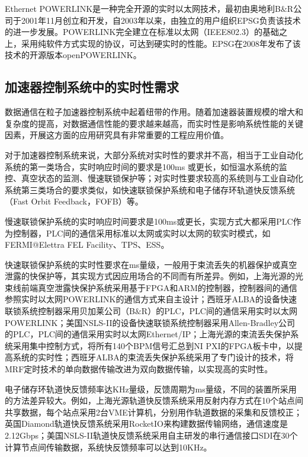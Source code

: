 Ethernet POWERLINK是一种完全开源的实时以太网技术，最初由奥地利B$\&$R公司于2001年11月创立和开发，自2003年以来，由独立的用户组织EPSG负责该技术的进一步发展。POWERLINK完全建立在标准以太网（IEEE802.3）的基础之上，采用纯软件方式实现的协议，可达到硬实时的性能。EPSG在2008年发布了该技术的开源版本openPOWERLINK\cite{powerlink}。

\subsection{加速器控制系统中的实时性需求}
数据通信在粒子加速器控制系统中起着纽带的作用。随着加速器装置规模的增大和复杂度的提高，对数据通信性能的要求越来越高，而实时性是影响系统性能的关键因素，开展这方面的应用研究具有非常重要的工程应用价值。

对于加速器控制系统来说，大部分系统对实时性的要求并不高，相当于工业自动化系统的第一类场合，实时响应时间的要求是100ms 或更长，如恒温水系统的监控、真空状态的监测、慢速联锁保护等；对实时性要求较高的系统则与工业自动化系统第三类场合的要求类似，如快速联锁保护系统和电子储存环轨道快反馈系统（Fast Orbit Feedback，FOFB）等。

慢速联锁保护系统的实时响应时间要求是100ms或更长，实现方式大都采用PLC作为控制器，PLC间的通信采用标准以太网或实时以太网的软实时模式，如FERMI@Elettra FEL Facility、TPS、ESS\cite{FERMI,Liao2014,ESS}。

快速联锁保护系统的实时性要求在ms量级，一般用于束流丢失的机器保护或真空泄露的快保护等，其实现方式因应用场合的不同而有所差异。例如，上海光源的光束线前端真空泄露快保护系统采用基于FPGA和ARM的控制器，控制器间的通信参照实时以太网POWERLINK的通信方式来自主设计；西班牙ALBA的设备快速联锁系统控制器采用贝加莱公司（B$\&$R）的PLC，PLC间的通信采用实时以太网POWERLINK；美国NSLS-II的设备快速联锁系统控制器采用Allen-Bradley公司的PLC，PLC间的通信采用实时以太网Ethernet/IP；上海光源的束流丢失保护系统采用集中控制方式，将所有140个BPM信号汇总到NI PXI的FPGA板卡中，以提高系统的实时性；西班牙ALBA的束流丢失保护系统采用了专门设计的技术，将MRF定时技术的单向数据传输改进为双向数据传输，以实现高的实时性。

电子储存环轨道快反馈频率达KHz量级，反馈周期为ms量级，不同的装置所采用的方法差异较大。例如，上海光源轨道快反馈系统采用反射内存方式在10个站点间共享数据，每个站点采用2台VME计算机，分别用作轨道数据的采集和反馈校正\cite{liu-2010}；英国Diamond轨道快反馈系统采用RocketIO来构建数据传输网络，通信速度是2.12Gbps\cite{DIAMOND-FOFB}；美国NSLS-II轨道快反馈系统采用自主研发的串行通信接口SDI在30个计算节点间传输数据，系统快反馈频率可以达到10KHz\cite{NSLS-II-FOFB}。


